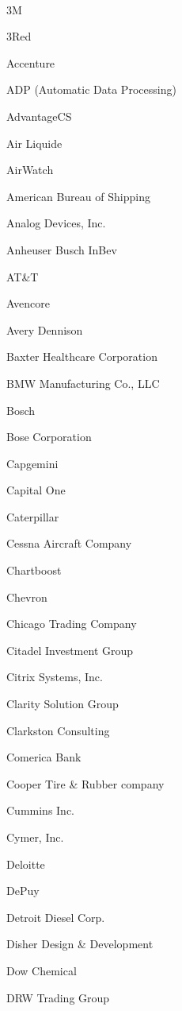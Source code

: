 \documentclass[twoside]{article}
\begin{document}
\begin{center}
\begin{multicols}{5}
        \vspace{-1em}
        ~\hrulefill~
        \vspace{-.9em}
        \begin{FlushLeft}
        \begin{compactitem}
        \item 3M
\item 3Red
\item Accenture
\item ADP (Automatic Data Processing)
\item AdvantageCS
\item Air Liquide
\item AirWatch
\item American Bureau of Shipping
\item Analog Devices, Inc.
\item Anheuser Busch InBev
\item AT\&T
\item Avencore
\item Avery Dennison
\item Baxter Healthcare Corporation
\item BMW Manufacturing Co., LLC
\item Bosch
\item Bose Corporation
\item Capgemini
\item Capital One
\item Caterpillar
\item Cessna Aircraft Company
\item Chartboost
\item Chevron
\item Chicago Trading Company
\item Citadel Investment Group
\item Citrix Systems, Inc.
\item Clarity Solution Group
\item Clarkston Consulting
\item Comerica Bank
\item Cooper Tire \& Rubber company
\item Cummins Inc.
\item Cymer, Inc.
\item Deloitte
\item DePuy
\item Detroit Diesel Corp.
\item Disher Design \& Development
\item Dow Chemical
\item DRW Trading Group

\end{compactitem}
\end{FlushLeft}
\end{multicols}
\end{center}
\end{document}
